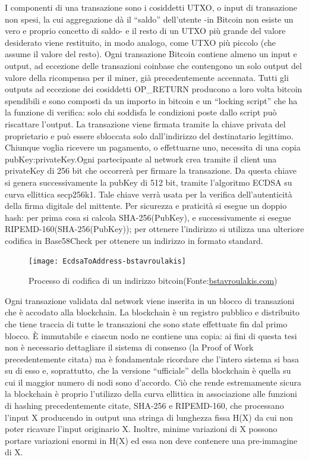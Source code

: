 I componenti di una transazione sono i cosiddetti UTXO, o input di transazione non spesi, la cui aggregazione dà il “saldo” dell’utente -in Bitcoin non esiste un vero e proprio concetto di saldo- e il resto di un UTXO più grande del valore desiderato viene restituito, in modo analogo, come UTXO più piccolo (che assume il valore del resto). 
Ogni transazione Bitcoin contiene almeno un input e output, ad eccezione delle transazioni coinbase che contengono un solo output del valore della ricompensa per il miner, già precedentemente accennata. Tutti gli outputs ad eccezione dei cosiddetti OP\_RETURN producono a loro volta bitcoin spendibili e sono composti da un importo in bitcoin e un “locking script” che ha la funzione di verifica: solo chi soddisfa le condizioni poste dallo script può riscattare l’output. La transazione viene firmata tramite la chiave privata del proprietario e può essere sbloccata solo dall’indirizzo del destinatario legittimo.
Chiunque voglia ricevere un pagamento, o effettuarne uno, necessita di una copia pubKey:privateKey.Ogni partecipante al network crea tramite il client una privateKey di 256 bit che occorrerà per firmare la transazione.
Da questa chiave si genera successivamente la pubKey di 512 bit, tramite l’algoritmo ECDSA su curva ellittica secp256k1.
Tale chiave verrà usata per la verifica dell'autenticità della firma digitale del mittente.  
Per sicurezza e praticità si esegue un doppio hash: per prima cosa si calcola SHA-256(PubKey), e successivamente si esegue RIPEMD-160(SHA-256(PubKey)); per ottenere l'indirizzo si utilizza una ulteriore codifica in Base58Check per ottenere un indirizzo in formato standard.


\begin{figure}[h!]
\centering
\texttt{[image: EcdsaToAddress-bstavroulakis]}
\caption{Processo di codifica di un indirizzo bitcoin(Fonte:\url{bstavroulakis.com})}
\label{fig:ecdsatoaddress-bstavroulakis}
\end{figure}


Ogni transazione validata dal network viene inserita in un blocco di transazioni che è accodato alla blockchain.
La blockchain è un registro pubblico e distribuito che tiene traccia di tutte le transazioni che sono state effettuate fin dal primo blocco. È immutabile e ciascun nodo ne contiene una copia: ai fini di questa tesi non è necessario dettagliare il sistema di consenso (la Proof of Work precedentemente citata) ma è fondamentale ricordare che l’intero sistema si basa su di esso e, soprattutto, che la versione “ufficiale” della blockchain è quella su cui il maggior numero di nodi sono d’accordo. Ciò che rende estremamente sicura la blockchain è proprio l’utilizzo della curva ellittica in associazione alle funzioni di hashing precedentemente citate, SHA-256 e RIPEMD-160, che processano l’input X producendo in output una stringa di lunghezza fissa H(X) da cui non poter ricavare l’input originario X. Inoltre, minime variazioni di X possono portare variazioni enormi in H(X) ed essa non deve contenere una pre-immagine di X.

